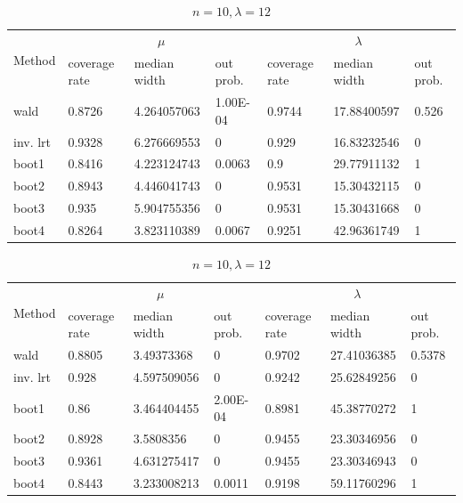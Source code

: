 \documentclass{article}
\begin{document}
\begin{table}[!htb]
       \begin{subtable}[b]{\textwidth}
		\centering
		\begin{tabular}{l|lll|lll}
		\toprule
        \multirow{2}{*}{Method} & \multicolumn{3}{c|}{$\mu$}      & \multicolumn{3}{c}{$\lambda$}  \\ 
                           & coverage rate & median width & out prob. & coverage rate & median width & out prob. \\
                           \midrule
wald      &0.8726&	4.264057063&	1.00E-04	&0.9744	&17.88400597&	0.526\\ 
inv. lrt  &0.9328&	6.276669553&	0	       & 0.929	&16.83232546&	0 \\
boot1     &0.8416&	4.223124743&	0.0063	   & 0.9	&29.77911132&	1 \\
boot2     &0.8943&	4.446041743&	0	       & 0.9531	&15.30432115&	0 \\
boot3     &0.935	&   5.904755356&	0	       & 0.9531	&15.30431668&	0 \\
boot4     &0.8264&	3.823110389&	0.0067	   & 0.9251	&42.96361749&	1 \\
       \bottomrule
       \end{tabular}
       \caption{$n = 10, \lambda = 8$}
       \label{10_8}
       \end{subtable}%

       \begin{subtable}[b]{\textwidth}
		\centering
		\begin{tabular}{l|lll|lll}
		\toprule
        \multirow{2}{*}{Method} & \multicolumn{3}{c|}{$\mu$}      & \multicolumn{3}{c}{$\lambda$}  \\ 
                           & coverage rate & median width & out prob. & coverage rate & median width & out prob. \\
                           \midrule
wald      &0.8805	&3.49373368	    &0         &0.9702	&27.41036385&	0.5378\\
inv. lrt  &0.928	&4.597509056	&0         &0.9242	&25.62849256&	0     \\
boot1     &0.86 	&3.464404455	&2.00E-04  &0.8981	&45.38770272&	1     \\
boot2     &0.8928	&3.5808356	    &0         &0.9455	&23.30346956&	0     \\
boot3     &0.9361	&4.631275417	&0         &0.9455	&23.30346943&	0     \\
boot4     &0.8443	&3.233008213	&0.0011    &0.9198	&59.11760296&	1     \\
       \bottomrule
       \end{tabular}
       \caption{$n = 10, \lambda = 12$}
       \label{10_12}
       \end{subtable}%


\end{table}
\end{document}
